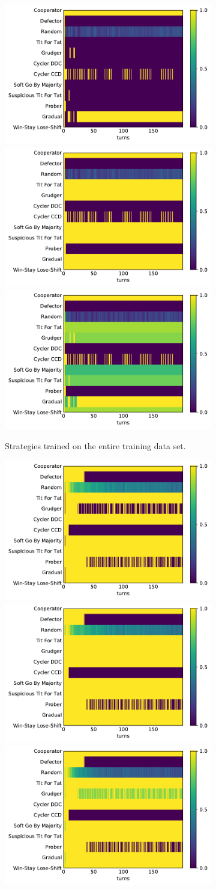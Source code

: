 \begin{figure}[!htbp]
    \begin{subfigure}{\textwidth}
        \includegraphics[width=.3\textwidth]{src/chapters/07/img/beautil_lstm_classification_0.pdf}
        \includegraphics[width=.3\textwidth]{src/chapters/07/img/beautil_lstm_classification_1.pdf}
        \includegraphics[width=.3\textwidth]{src/chapters/07/img/beautil_lstm_classification_0_78.pdf}
        \caption{Strategies trained on the entire training data set.}
    \end{subfigure}
    \begin{subfigure}{\textwidth}
        \includegraphics[width=.3\textwidth]{src/chapters/07/img/beautil_top_twenty_classification_0.pdf}
        \includegraphics[width=.3\textwidth]{src/chapters/07/img/beautil_top_twenty_classification_1.pdf}
        \includegraphics[width=.3\textwidth]{src/chapters/07/img/beautil_top_twenty_classification_0_78.pdf}

\end{subfigure}
\end{figure}
